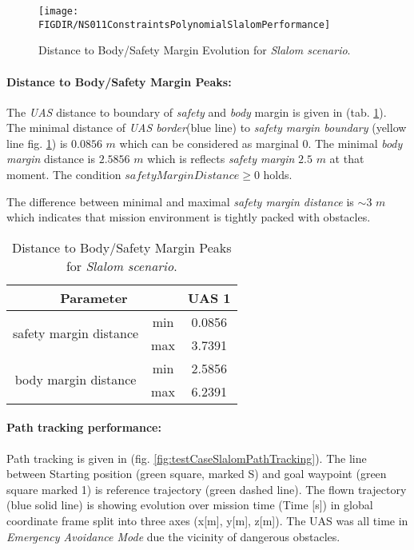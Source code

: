 \begin{figure}[H]
    \centering
    \texttt{[image: \\FIGDIR/NS011ConstraintsPolynomialSlalomPerformance]} 
    \caption{Distance to Body/Safety Margin Evolution for \emph{Slalom scenario}.}
    \label{fig:testCaseSlalomAvoidancePerformance}
\end{figure}

\paragraph{Distance to Body/Safety Margin Peaks:} The \emph{UAS} distance to boundary of \emph{safety} and  \emph{body} margin is given in (tab. \ref{tab:testCaseSlalomSafetyAndBodyMarginDistances}). The minimal distance of \emph{UAS border}(blue line) to \emph{safety margin boundary} (yellow line fig. \ref{fig:testCaseSlalomAvoidancePerformance}) is $0.0856$ $m$ which can be considered as marginal $0$. The minimal \emph{body margin} distance is $2.5856$ $m$ which is reflects \emph{safety margin} $2.5$ $m$ at that moment. The condition $safety Margin Distance \ge 0$ holds.
    
    
The difference between minimal and maximal \emph{safety margin distance} is $\sim 3$ $m$ which indicates that mission environment is  tightly packed with obstacles.

\begin{table}[H]
    \centering
    \begin{tabular}{c|c||c}
    \multicolumn{2}{c||}{Parameter} & UAS 1 \\\hline\hline
    \multirow{2}{*}{safety margin distance} & min & 0.0856\\\cline{2-3}
                                            & max & 3.7391 \\\hline
    \multirow{2}{*}{body margin distance}   & min & 2.5856  \\\cline{2-3}
                                            & max & 6.2391 
    \end{tabular}
    \caption{Distance to Body/Safety Margin Peaks for \emph{Slalom scenario}.}
    \label{tab:testCaseSlalomSafetyAndBodyMarginDistances}
\end{table}


\paragraph{Path tracking performance:} Path tracking is given in (fig. \ref{fig:testCaseSlalomPathTracking}). The line between Starting position (green square, marked S) and  goal waypoint (green square marked 1) is reference trajectory (green dashed line). The flown trajectory (blue solid line) is showing evolution over mission time (Time [s]) in global coordinate frame split into three axes (x[m], y[m], z[m]). The UAS was all time in \emph{Emergency Avoidance Mode} due the vicinity of dangerous obstacles. 

